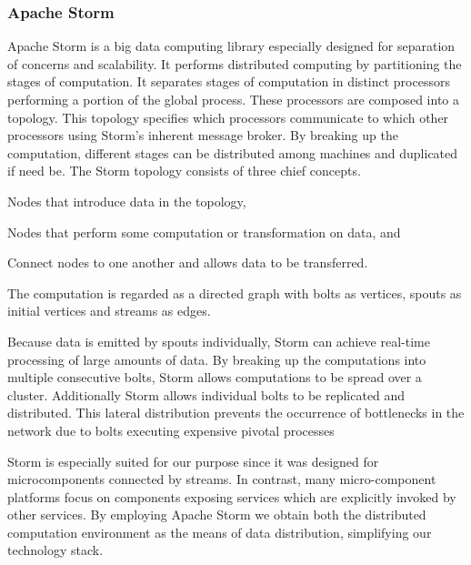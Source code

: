 \subsubsection*{Apache Storm}
Apache Storm is a big data computing library especially designed for separation of concerns and scalability. It performs distributed computing by partitioning the stages of computation. It separates stages of computation in distinct processors performing a portion of the global process. These processors are composed into a topology. This topology specifies which processors communicate to which other processors using Storm's inherent message broker. By breaking up the computation, different stages can be distributed among machines and duplicated if need be. The Storm topology consists of three chief concepts.
\begin{description}[style=nextline]
\nospace
\item[Spouts] Nodes that introduce data in the topology,
\item[Bolts] Nodes that perform some computation or transformation on data, and
\item[Streams] Connect nodes to one another and allows data to be transferred.
\end{description}
The computation is regarded as a directed graph with bolts as vertices, spouts as initial vertices and streams as edges.

Because data is emitted by spouts individually, Storm can achieve real-time processing of large amounts of data. By breaking up the computations into multiple consecutive bolts, Storm allows computations to be spread over a cluster. Additionally Storm allows individual bolts to be replicated and distributed. This lateral distribution prevents the occurrence of bottlenecks in the network due to bolts executing expensive pivotal processes

Storm is especially suited for our purpose since it was designed for microcomponents connected by streams. In contrast, many micro-component platforms focus on components exposing services which are explicitly invoked by other services\cite{refs: spring, etc}. By employing Apache Storm we obtain both the distributed computation environment as the means of data distribution, simplifying our technology stack.

